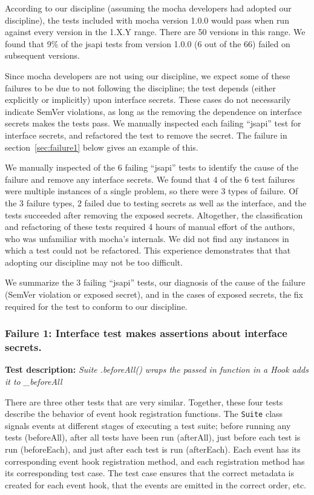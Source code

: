 According to our discipline (assuming the mocha developers had adopted
our discipline), the tests included with mocha version 1.0.0 would
pass when run against every version in the 1.X.Y range. There are 50
versions in this range. We found that 9\% of the jsapi tests from
version 1.0.0 (6 out of the 66) failed on subsequent versions.

Since mocha developers are not using our discipline, we expect some of
these failures to be due to not following the discipline; the test
depends (either explicitly or implicitly) upon interface secrets. These
cases do not necessarily indicate SemVer violations, as long as the
removing the dependence on interface secrets makes the tests pass. We
manually inspected each failing ``jsapi'' test for interface secrets, and
refactored the test to remove the secret. The failure in
section~\ref{sec:failure1} below gives an example of this.

We manually inspected of the 6 failing ``jsapi'' tests to identify the
cause of the failure and remove any interface secrets. We found that 4 of
the 6 test failures were multiple instances of a single problem, so
there were 3 types of failure. Of the 3 failure types, 2 failed due to
testing secrets as well as the interface, and the tests succeeded after
removing the exposed secrets. Altogether, the classification and
refactoring of these tests required 4 hours of manual effort of the
authors, who was unfamiliar with mocha's internals. We did not find any
instances in which a test could not be refactored. This experience
demonstrates that that adopting our discipline may not be too difficult.

We summarize the 3 failing ``jsapi'' tests, our diagnosis of the cause of
the failure (SemVer violation or exposed secret), and in the cases of
exposed secrets, the fix required for the test to conform to our
discipline.

\subsubsection{Failure 1: Interface test makes assertions about
interface secrets.}
{\bf Test description: } {\em Suite .beforeAll() wraps the passed in
function in a Hook adds it to \_beforeAll}
\label{sec:failure1}

There are three other tests that are very similar. Together, these
four tests describe the behavior of event hook registration
functions. The {\tt Suite} class signals events at different stages of
executing a test suite; before running any tests (beforeAll), after
all tests have been run (afterAll), just before each test is run
(beforeEach), and just after each test is run (afterEach). Each event
has its corresponding event hook registration method, and each
registration method has its corresponding test case. The test case
ensures that the correct metadata is created for each event hook, that
the events are emitted in the correct order, etc.

